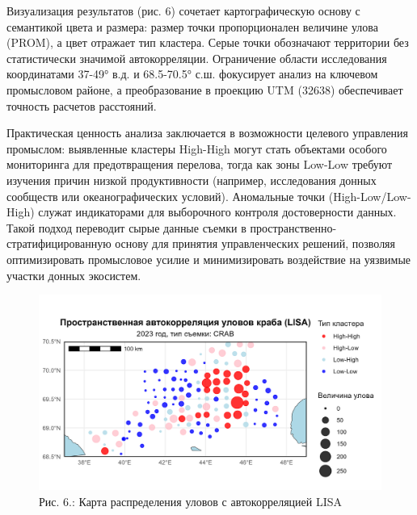 \documentclass[
  letterpaper,
  DIV=11,
  numbers=noendperiod]{scrreprt}
\begin{document}
Визуализация результатов (рис. 6) сочетает картографическую основу с
семантикой цвета и размера: размер точки пропорционален величине улова
(PROM), а цвет отражает тип кластера. Серые точки обозначают территории
без статистически значимой автокорреляции. Ограничение области
исследования координатами 37-49° в.д. и 68.5-70.5° с.ш. фокусирует
анализ на ключевом промысловом районе, а преобразование в проекцию UTM
(32638) обеспечивает точность расчетов расстояний.

Практическая ценность анализа заключается в возможности целевого
управления промыслом: выявленные кластеры High-High могут стать
объектами особого мониторинга для предотвращения перелова, тогда как
зоны Low-Low требуют изучения причин низкой продуктивности (например,
исследования донных сообществ или океанографических условий). Аномальные
точки (High-Low/Low-High) служат индикаторами для выборочного контроля
достоверности данных. Такой подход переводит сырые данные съемки в
пространственно-стратифицированную основу для принятия управленческих
решений, позволяя оптимизировать промысловое усилие и минимизировать
воздействие на уязвимые участки донных экосистем.

\begin{figure}[H]

{\centering \includegraphics[width=0.8\linewidth,height=\textheight,keepaspectratio]{images/KARTOGRAPH6.jpg}

}

\caption{Рис. 6.: Карта распределения уловов с автокорреляцией LISA}

\end{figure}%
\end{document}

